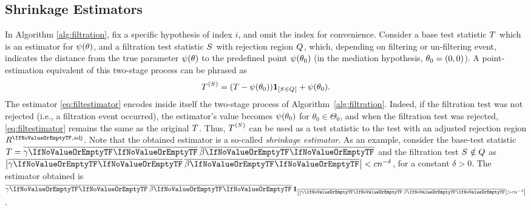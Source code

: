 \documentclass[ejs, twoside]{imsart}
\theoremstyle{plain}
\theoremstyle{remark}
\newcommand{\fullstop}{\text{.}}
\numberwithin{equation}{section}
\numberwithin{table}{section}
\numberwithin{figure}{section}
\let\originalleft\left
\let\originalright\right
\renewcommand{\left}{\mathopen{}\mathclose\bgroup\originalleft}
\renewcommand{\right}{\aftergroup\egroup\originalright}
\begin{document}
\subsection{Shrinkage Estimators} \label{sec:filt-shrinkage}

In Algorithm \ref{alg:filtration}, fix a specific hypothesis of index \(i\), and omit the index for convenience. Consider a base test statistic \(\basestat\) which is an estimator for \(\psi\left(\theta \right) \), and a filtration test statistic \(\filtstat\) with rejection region \(\filtrr\), which, depending on filtering or un-filtering event, indicates the distance from the true parameter \(\psi\left(\theta \right) \) to the predefined point \(\psi\left(\theta_0 \right) \) (in the mediation hypothesis, \(\theta_0 = \left(0,0 \right) \)). A point-estimation equivalent of this two-stage process can be phrased as
\begin{equation} \label{eq:filtestimator}
	\shrinkestim = \left(T - \psi\left(\theta_0\right)\right) \indc{\nfilevent} + \psi\left( \theta_0\right) \fullstop
\end{equation}
The estimator \eqref{eq:filtestimator} encodes inside itself the two-stage process of Algorithm~\ref{alg:filtration}. Indeed, if the filtration test was not rejected (i.e., a filtration event occurred), the estimator's value becomes \(\psi\left(\theta_0 \right) \) for \(\theta_0 \in \Theta_0\), and when the filtration test was rejected, \eqref{eq:filtestimator} remains the same as the original \(\basestat\). Thus, \(\shrinkestim\) can be used as a test statistic to the test with an adjusted rejection region \(\baserradj\). Note that the obtained estimator is a so-called \emph{shrinkage estimator}. As an example, consider the base-test statistic \(T = \product\) and the filtration test \(\filevent\) as \(\left| \product \right| < cn^{-\delta} \), for a constant \(\delta > 0 \). The estimator obtained is \(\product \,\indc{\left| \product \right| > cn^{-\delta} }\).
\end{document}
